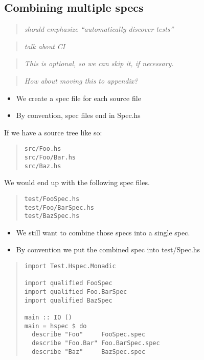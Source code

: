 \documentclass[preprint]{sigplanconf}
\begin{document}
\subsection{Combining multiple specs}

\begin{quote}
    \emph{should emphasize ``automatically discover tests''}
\end{quote}

\begin{quote}
    \emph{talk about CI}
\end{quote}

\begin{quote}
\emph{This is optional, so we can skip it, if necessary.}
\end{quote}

\begin{quote}
\emph{How about moving this to appendix?}
\end{quote}

\begin{itemize}
\item We create a spec file for each source file
\item By convention, spec files end in Spec.hs
\end{itemize}

\noindent If we have a source tree like so:

\begin{quote}
\small
\begin{verbatim}
src/Foo.hs
src/Foo/Bar.hs
src/Baz.hs
\end{verbatim}
\end{quote}

\noindent We would end up with the following spec files.

\begin{quote}
\small
\begin{verbatim}
test/FooSpec.hs
test/Foo/BarSpec.hs
test/BazSpec.hs
\end{verbatim}
\end{quote}

\begin{itemize}
\item We still want to combine those specs into a single spec.
\item By convention we put the combined spec into test/Spec.hs
\end{itemize}

\begin{quote}
\small
\begin{verbatim}
import Test.Hspec.Monadic

import qualified FooSpec
import qualified Foo.BarSpec
import qualified BazSpec

main :: IO ()
main = hspec $ do
  describe "Foo"     FooSpec.spec
  describe "Foo.Bar" Foo.BarSpec.spec
  describe "Baz"     BazSpec.spec
\end{verbatim}
\end{quote}
\end{document}
